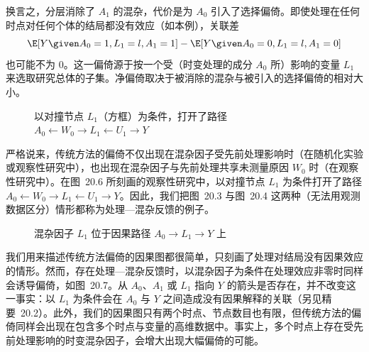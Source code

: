 换言之，分层消除了 $A_1$ 的混杂，代价是为 $A_0$ 引入了选择偏倚。即使处理在任何时点对任何个体的结局都没有效应（如本例），关联差
\[
\E[Y\given A_0=1,L_1=l,A_1=1]-\E[Y\given A_0=0,L_1=l,A_1=0]
\]
也可能不为 0。这一偏倚源于按一个受（时变处理的成分 $A_0$ 所）影响的变量 $L_1$ 来选取研究总体的子集。净偏倚取决于被消除的混杂与被引入的选择偏倚的相对大小。

\begin{figure}[htbp]
\centering
{}
\caption{以对撞节点 $L_1$（方框）为条件，打开了路径 $A_0\leftarrow W_0\to L_1\leftarrow U_1\to Y$}
\label{fig:20.6}
\end{figure}

严格说来，传统方法的偏倚不仅出现在混杂因子受先前处理影响时（在随机化实验或观察性研究中），也出现在混杂因子与先前处理共享未测量原因 $W_0$ 时（在观察性研究中）。在图~20.6 所刻画的观察性研究中，以对撞节点 $L_1$ 为条件打开了路径 $A_0\leftarrow W_0\to L_1\leftarrow U_1\to Y$。因此，我们把图~20.3 与图~20.4 这两种（无法用观测数据区分）情形都称为处理—混杂反馈的例子。

\begin{figure}[htbp]
\centering
{}
\caption{混杂因子 $L_1$ 位于因果路径 $A_0\to L_1\to Y$ 上}
\label{fig:20.7}
\end{figure}

我们用来描述传统方法偏倚的因果图都很简单，只刻画了处理对结局没有因果效应的情形。然而，存在处理—混杂反馈时，以混杂因子为条件在处理效应非零时同样会诱导偏倚，如图~20.7。从 $A_0$、$A_1$ 或 $L_1$ 指向 $Y$ 的箭头是否存在，并不改变这一事实：以 $L_1$ 为条件会在 $A_0$ 与 $Y$ 之间造成没有因果解释的关联（另见精要~20.2）。此外，我们的因果图只有两个时点、节点数目也有限，但传统方法的偏倚同样会出现在包含多个时点与变量的高维数据中。事实上，多个时点上存在受先前处理影响的时变混杂因子，会增大出现大幅偏倚的可能。

